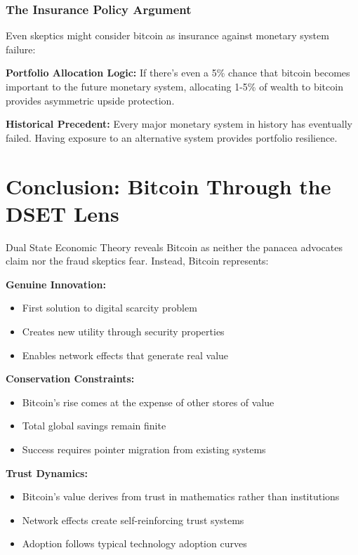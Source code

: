 \documentclass[11pt,oneside]{book}
\begin{document}
\subsubsection{The Insurance Policy Argument}

Even skeptics might consider bitcoin as insurance against monetary system failure:

\textbf{Portfolio Allocation Logic:}
If there's even a 5\% chance that bitcoin becomes important to the future monetary system, allocating 1-5\% of wealth to bitcoin provides asymmetric upside protection.

\textbf{Historical Precedent:}
Every major monetary system in history has eventually failed. Having exposure to an alternative system provides portfolio resilience.

\section{Conclusion: Bitcoin Through the DSET Lens}

Dual State Economic Theory reveals Bitcoin as neither the panacea advocates claim nor the fraud skeptics fear. Instead, Bitcoin represents:

\textbf{Genuine Innovation:}
\begin{itemize}
\item First solution to digital scarcity problem
\item Creates new utility through security properties
\item Enables network effects that generate real value
\end{itemize}

\textbf{Conservation Constraints:}
\begin{itemize}
\item Bitcoin's rise comes at the expense of other stores of value
\item Total global savings remain finite
\item Success requires pointer migration from existing systems
\end{itemize}

\textbf{Trust Dynamics:}
\begin{itemize}
\item Bitcoin's value derives from trust in mathematics rather than institutions
\item Network effects create self-reinforcing trust systems
\item Adoption follows typical technology adoption curves
\end{itemize}
\end{document}
